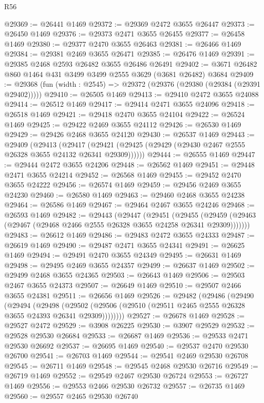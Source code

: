 \begin{lexlean}{R56}
\begin{coremodule}
@29369 := @26441 @1469
@29372 := @29369 @2472 @3655 @26447
@29373 := @26450 @1469
@29376 := @29373 @2471 @3655 @26455
@29377 := @26458 @1469
@29380 := @29377 @2470 @3655 @26463
@29381 := @26466 @1469
@29384 := @29381 @2469 @3655 @26471
@29385 := @26476 @1469
@29391 := @29385 @2468 @2593 @26482 @3655 @26486 @26491
@29402 := @3671 @26482 @860 @1464 @431 @3499 @3499 @2555 @3629 (@3681 @26482) @3684
@29409 := @29368 (fun (width : @2545) => @29372 (@29376 (@29380 (@29384 (@29391 @29402)))))
@29410 := @26505 @1469
@29413 := @29410 @2472 @3655 @24088
@29414 := @26512 @1469
@29417 := @29414 @2471 @3655 @24096
@29418 := @26518 @1469
@29421 := @29418 @2470 @3655 @24104
@29422 := @26524 @1469
@29425 := @29422 @2469 @3655 @24112
@29426 := @26530 @1469
@29429 := @29426 @2468 @3655 @24120
@29430 := @26537 @1469
@29443 := @29409
    (@29413
      (@29417 (@29421 (@29425 (@29429 (@29430 @2467 @2555 @26328 @3655 @24132 @26341 @29309))))))
@29444 := @26555 @1469
@29447 := @29444 @2472 @3655 @24206
@29448 := @26562 @1469
@29451 := @29448 @2471 @3655 @24214
@29452 := @26568 @1469
@29455 := @29452 @2470 @3655 @24222
@29456 := @26574 @1469
@29459 := @29456 @2469 @3655 @24230
@29460 := @26580 @1469
@29463 := @29460 @2468 @3655 @24238
@29464 := @26586 @1469
@29467 := @29464 @2467 @3655 @24246
@29468 := @26593 @1469
@29482 := @29443
    (@29447
      (@29451
        (@29455 (@29459 (@29463 (@29467 (@29468 @2466 @2555 @26328 @3655 @24258 @26341 @29309)))))))
@29483 := @26612 @1469
@29486 := @29483 @2472 @3655 @24333
@29487 := @26619 @1469
@29490 := @29487 @2471 @3655 @24341
@29491 := @26625 @1469
@29494 := @29491 @2470 @3655 @24349
@29495 := @26631 @1469
@29498 := @29495 @2469 @3655 @24357
@29499 := @26637 @1469
@29502 := @29499 @2468 @3655 @24365
@29503 := @26643 @1469
@29506 := @29503 @2467 @3655 @24373
@29507 := @26649 @1469
@29510 := @29507 @2466 @3655 @24381
@29511 := @26656 @1469
@29526 := @29482
    (@29486
      (@29490
        (@29494
          (@29498
            (@29502 (@29506 (@29510 (@29511 @2465 @2555 @26328 @3655 @24393 @26341 @29309))))))))
@29527 := @26678 @1469
@29528 := @29527 @2472
@29529 := @3908 @26225
@29530 := @3907 @29529
@29532 := @29528 @29530 @26684
@29533 := @26687 @1469
@29536 := @29533 @2471 @29530 @26692
@29537 := @26695 @1469
@29540 := @29537 @2470 @29530 @26700
@29541 := @26703 @1469
@29544 := @29541 @2469 @29530 @26708
@29545 := @26711 @1469
@29548 := @29545 @2468 @29530 @26716
@29549 := @26719 @1469
@29552 := @29549 @2467 @29530 @26724
@29553 := @26727 @1469
@29556 := @29553 @2466 @29530 @26732
@29557 := @26735 @1469
@29560 := @29557 @2465 @29530 @26740

\end{coremodule}
\end{lexlean}
